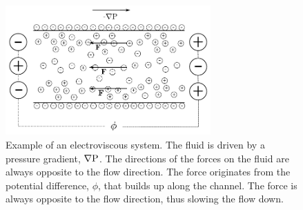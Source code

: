 \begin{figure}
\begin{center}
\includegraphics[width=0.7\textwidth]{fig/channel_electroviscous.pdf}
\end{center}
\caption[Example of an electroviscous system.]{Example of an
  electroviscous system. The fluid is driven by a pressure gradient,
  $\nabla \mathrm{P}$. The directions of the forces on the fluid are always
  opposite to the flow direction. The force originates from the
  potential difference, $\phi$, that builds up along the channel. The
  force is always opposite to the flow direction, thus slowing the
  flow down.}
\label{fig:et:ev}
\end{figure}
